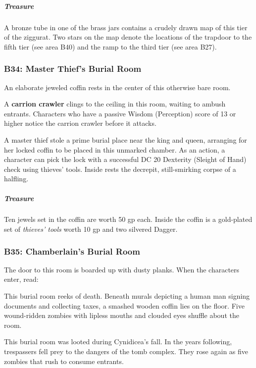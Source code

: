 \documentclass[10pt,a4paper,twoside,bg=print,twocolumn,openany,nodeprecatedcode]{dndbook}
\begin{document}
\subparagraph{Treasure}
A bronze tube in one of the brass jars contains a crudely drawn map of this tier of the ziggurat. Two stars on the map denote the locations of the trapdoor to the fifth tier (see area B40) and the ramp to the third tier (see area B27).

\subsubsection{B34: Master Thief's Burial Room}
\begin{DndReadAloud}{}
An elaborate jeweled coffin rests in the center of this otherwise bare room.

\end{DndReadAloud}

A \textbf{carrion crawler} clings to the ceiling in this room, waiting to ambush entrants. Characters who have a passive Wisdom (Perception) score of 13 or higher notice the carrion crawler before it attacks.

A master thief stole a prime burial place near the king and queen, arranging for her locked coffin to be placed in this unmarked chamber. As an action, a character can pick the lock with a successful DC 20 Dexterity (Sleight of Hand) check using thieves' tools. Inside rests the decrepit, still-smirking corpse of a halfling.

\subparagraph{Treasure}
Ten jewels set in the coffin are worth 50 gp each. Inside the coffin is a gold-plated set of \textit{thieves' tools} worth 10 gp and two silvered Dagger.

\subsubsection{B35: Chamberlain's Burial Room}
The door to this room is boarded up with dusty planks. When the characters enter, read:

\begin{DndReadAloud}{}
This burial room reeks of death. Beneath murals depicting a human man signing documents and collecting taxes, a smashed wooden coffin lies on the floor. Five wound-ridden zombies with lipless mouths and clouded eyes shuffle about the room.

\end{DndReadAloud}

This burial room was looted during Cynidicea's fall. In the years following, trespassers fell prey to the dangers of the tomb complex. They rose again as five zombies that rush to consume entrants.
\end{document}
